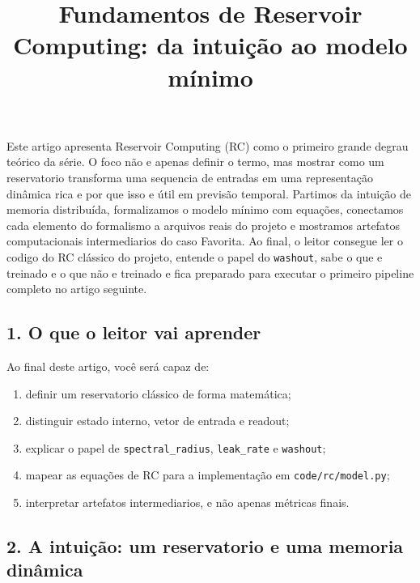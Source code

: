 \documentclass[12pt]{article}
\title{Fundamentos de Reservoir Computing: da intuição ao modelo mínimo}
\author{}
\providecommand{\tightlist}{%
          \setlength{\itemsep}{0pt}\setlength{\parskip}{0pt}}
\begin{document}
        \maketitle

        \begin{resumo}
        Este artigo apresenta Reservoir Computing (RC) como o primeiro grande degrau teórico da série. O foco não e apenas definir o termo, mas mostrar como um reservatorio transforma uma sequencia de entradas em uma representação dinâmica rica e por que isso e útil em previsão temporal. Partimos da intuição de memoria distribuída, formalizamos o modelo mínimo com equações, conectamos cada elemento do formalismo a arquivos reais do projeto e mostramos artefatos computacionais intermediarios do caso Favorita. Ao final, o leitor consegue ler o codigo do RC clássico do projeto, entende o papel do \texttt{washout}, sabe o que e treinado e o que não e treinado e fica preparado para executar o primeiro pipeline completo no artigo seguinte.
        \end{resumo}

        \subsection{1. O que o leitor vai aprender}\label{1-o-que-o-leitor-vai-aprender}

Ao final deste artigo, você será capaz de:

\begin{enumerate}
\def\labelenumi{\arabic{enumi}.}
\tightlist
\item
  definir um reservatorio clássico de forma matemática;
\item
  distinguir estado interno, vetor de entrada e readout;
\item
  explicar o papel de \texttt{spectral\_radius}, \texttt{leak\_rate} e \texttt{washout};
\item
  mapear as equações de RC para a implementação em \texttt{code/rc/model.py};
\item
  interpretar artefatos intermediarios, e não apenas métricas finais.
\end{enumerate}

\subsection{2. A intuição: um reservatorio e uma memoria dinâmica}\label{2-a-intuiuxe7uxe3o-um-reservatorio-e-uma-memoria-dinuxe2mica}
\end{document}
